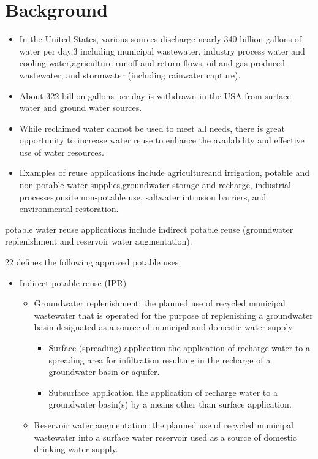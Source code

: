 
\chapter{Background}
\begin{itemize}
\item In the United States, various sources discharge nearly 340 billion gallons of water per day,3 including municipal wastewater, industry process water and cooling water,agriculture runoff and return flows, oil and gas produced wastewater, and stormwater (including rainwater capture).

\item About 322 billion gallons per day is withdrawn in the USA from surface water and ground water sources.

\item While reclaimed water cannot be used to meet all needs, there is great opportunity to increase water reuse to enhance the availability and effective use of water resources.

\item Examples of reuse applications include agricultureand irrigation, potable and non-potable water supplies,groundwater storage and recharge, industrial processes,onsite non-potable use, saltwater intrusion barriers, and environmental restoration.
\end{itemize}

 potable water reuse applications include indirect potable reuse (groundwater replenishment and reservoir water augmentation). 
 
 22 defines the following approved potable uses:
\begin{itemize}
\item Indirect potable reuse (IPR)
\begin{itemize}
\item Groundwater replenishment: the planned use of recycled municipal wastewater that is operated for the purpose of replenishing a groundwater basin designated as a source of municipal and domestic water supply.
\begin{itemize}
\item Surface (spreading) application the application of recharge water to a spreading area for infiltration resulting in the recharge of a groundwater basin or aquifer.
\item Subsurface application the application of recharge water to a groundwater basin(s) by a means other than surface application.
\end{itemize}
\item Reservoir water augmentation: the planned use of recycled municipal wastewater into a surface water reservoir used as a source of domestic drinking water supply.
\end{itemize}
\end{itemize}

